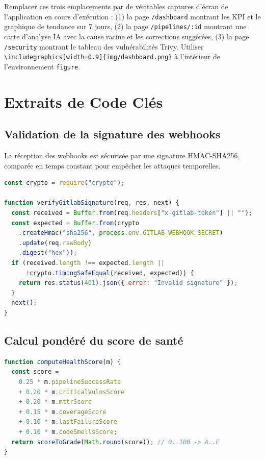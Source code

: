 \documentclass[12pt,a4paper,oneside]{report}
\begin{document}
\begin{note}
Remplacer ces trois emplacements par de véritables captures d'écran de l'application en cours d'exécution : (1) la page \texttt{/dashboard} montrant les KPI et le graphique de tendance sur 7 jours, (2) la page \texttt{/pipelines/:id} montrant une carte d'analyse IA avec la cause racine et les corrections suggérées, (3) la page \texttt{/security} montrant le tableau des vulnérabilités Trivy. Utiliser \texttt{\textbackslash includegraphics[width=0.9\textwidth]\{img/dashboard.png\}} à l'intérieur de l'environnement \texttt{figure}.
\end{note}

\section{Extraits de Code Clés}
\subsection{Validation de la signature des webhooks}
La réception des webhooks est sécurisée par une signature HMAC-SHA256, comparée en temps constant pour empêcher les attaques temporelles.

\begin{lstlisting}[style=custom,language=JavaScript,caption={Middleware de validation HMAC (extrait)},label={lst:hmac}]
const crypto = require("crypto");

function verifyGitlabSignature(req, res, next) {
  const received = Buffer.from(req.headers["x-gitlab-token"] || "");
  const expected = Buffer.from(crypto
    .createHmac("sha256", process.env.GITLAB_WEBHOOK_SECRET)
    .update(req.rawBody)
    .digest("hex"));
  if (received.length !== expected.length ||
      !crypto.timingSafeEqual(received, expected)) {
    return res.status(401).json({ error: "Invalid signature" });
  }
  next();
}
\end{lstlisting}

\subsection{Calcul pondéré du score de santé}
\begin{lstlisting}[style=custom,language=JavaScript,caption={Calcul pondéré du score de santé (extrait)},label={lst:healthscorecalc}]
function computeHealthScore(m) {
  const score =
    0.25 * m.pipelineSuccessRate
    + 0.20 * m.criticalVulnsScore
    + 0.20 * m.mttrScore
    + 0.15 * m.coverageScore
    + 0.10 * m.lastFailureScore
    + 0.10 * m.codeSmellsScore;
  return scoreToGrade(Math.round(score)); // 0..100 -> A..F
}
\end{lstlisting}
\end{document}
